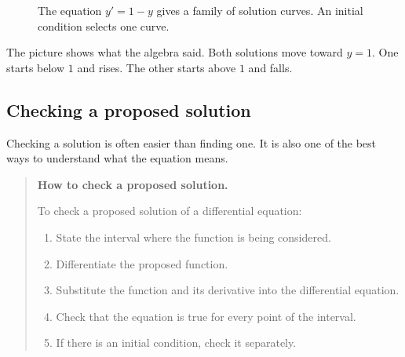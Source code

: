 \begin{figure}[h]
\centering
{}
\caption{The equation \(y'=1-y\) gives a family of solution curves.  An initial condition selects one curve.}
\label{fig:initial-values-select-solutions}
\end{figure}

The picture shows what the algebra said.  Both solutions move toward \(y=1\).  One
starts below \(1\) and rises.  The other starts above \(1\) and falls.

\subsection{Checking a proposed solution}
\label{subsec:checking-proposed-solution}

Checking a solution is often easier than finding one.  It is also one of the best ways to
understand what the equation means.

\begin{quote}
\textbf{How to check a proposed solution.}

To check a proposed solution of a differential equation:

\begin{enumerate}
\item State the interval where the function is being considered.

\item Differentiate the proposed function.

\item Substitute the function and its derivative into the differential equation.

\item Check that the equation is true for every point of the interval.

\item If there is an initial condition, check it separately.
\end{enumerate}
\end{quote}

